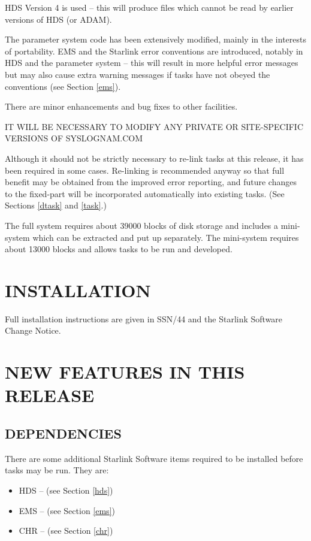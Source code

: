 HDS Version 4 is used -- this will produce files which cannot be read by earlier
versions of HDS (or ADAM).

The parameter system code has been extensively modified, mainly in the
interests of portability. 
EMS and the Starlink error conventions are introduced, notably in HDS and the
parameter system -- this will result in more helpful error messages but may
also cause extra warning messages if tasks have not obeyed the conventions
(see Section \ref{ems}).

There are minor enhancements and bug fixes to other facilities.

IT WILL BE NECESSARY TO MODIFY ANY PRIVATE OR SITE-SPECIFIC VERSIONS OF
SYSLOGNAM.COM

Although it should not be strictly necessary to re-link tasks at this release,
it has been required in some cases.
Re-linking is recommended anyway so that full benefit may be obtained from the 
improved error reporting, and future changes to the fixed-part will be
incorporated automatically into existing tasks.
(See Sections \ref{dtask} and \ref{task}.)

The full system requires about 39000 blocks of disk storage and includes a
mini-system which can be extracted and put up separately. The mini-system
requires about 13000 blocks and allows tasks to be run and  developed.

\section{INSTALLATION}
Full installation instructions are given in SSN/44 and the Starlink Software 
Change Notice.

\section{NEW FEATURES IN THIS RELEASE}

\subsection{DEPENDENCIES}
There are some additional Starlink Software items required to be installed
before tasks may be run.
They are:
\begin{itemize}
\item HDS -- (see Section \ref{hds})
\item EMS -- (see Section \ref{ems})
\item CHR -- (see Section \ref{chr})
\end{itemize}


